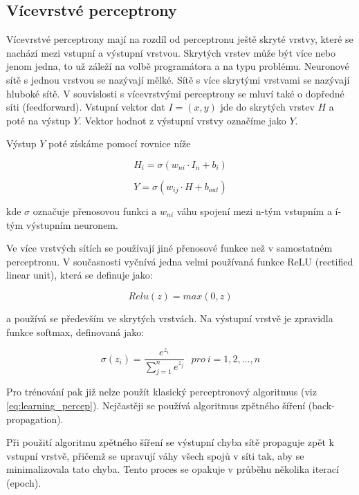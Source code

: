 \documentclass[FM,BP,fonts]{tulthesis}
\begin{document}
\subsection{Vícevrstvé perceptrony}
Vícevrstvé perceptrony mají na rozdíl od perceptronu ještě skryté vrstvy, které se nachází mezi vstupní a výstupní vrstvou. Skrytých vrstev může být více nebo jenom jedna, to už záleží na volbě programátora a na typu problému. Neuronové sítě s jednou vrstvou se nazývají mělké. Sítě s více skrytými vrstvami se nazývají hluboké sítě. V souvislosti s vícevrstvými perceptrony se mluví také o dopředné síti (feedforward). Vstupní vektor dat $I = (x,y)$ jde do skrytých vrstev $H$ a poté na výstup $Y$. Vektor hodnot z výstupní vrstvy označíme jako $Y$. 

\newpage
Výstup $Y$ poté získáme pomocí rovnice níže 

\begin{equation}
	H_i = \sigma(w_{ni} \cdot I_n + b_i)
\end{equation}


\begin{equation}
	Y = \sigma(w_{ij} \cdot H + b_{out})
\end{equation}

kde $\sigma$ označuje přenosovou funkci a $w_{ni}$ váhu spojení mezi n-tým vstupním a í-tým výstupním neuronem.

Ve více vrstvých sítích se používají jiné přenosové funkce než v samostatném perceptronu. V současnosti vyčnívá jedna velmi používaná funkce ReLU (rectified linear unit), která se definuje jako:

\begin{equation}
	Relu(z) = max(0, z)
\end{equation}

a používá se především ve skrytých vrstvách. \cite{brownlee2019gentle} Na výstupní vrstvě je zpravidla funkce softmax, definovaná jako:

\begin{equation}
	\sigma(z_i) = \frac{e^{z_{i}}}{\sum_{j=1}^n e^{z_{j}}} \ \ \ pro\ i=1,2,\dots,n
\end{equation}

Pro trénování pak již nelze použít klasický perceptronový algoritmus (viz \ref{eq:learning_percep}). Nejčastěji se používá algoritmus zpětného šíření (back-propagation).

Při použití algoritmu zpětného šíření se výstupní chyba sítě propaguje zpět k vstupní vrstvě, přičemž se upravují váhy všech spojů v síti tak, aby se minimalizovala tato chyba. Tento proces se opakuje v průběhu několika iterací (epoch).
\end{document}
